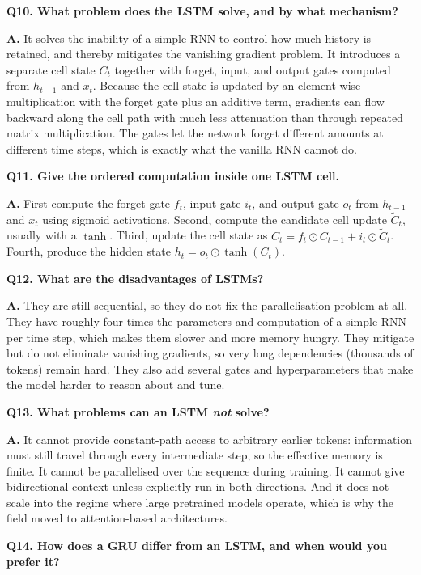 \documentclass[11pt]{article}
\begin{document}
\noindent\textbf{Q10. What problem does the LSTM solve, and by what mechanism?}

\noindent\textbf{A.} It solves the inability of a simple RNN to control how much history is retained, and thereby mitigates the vanishing gradient problem. It introduces a separate cell state $C_t$ together with forget, input, and output gates computed from $h_{t-1}$ and $x_t$. Because the cell state is updated by an element-wise multiplication with the forget gate plus an additive term, gradients can flow backward along the cell path with much less attenuation than through repeated matrix multiplication. The gates let the network forget different amounts at different time steps, which is exactly what the vanilla RNN cannot do.

\medskip
\noindent\textbf{Q11. Give the ordered computation inside one LSTM cell.}

\noindent\textbf{A.} First compute the forget gate $f_t$, input gate $i_t$, and output gate $o_t$ from $h_{t-1}$ and $x_t$ using sigmoid activations. Second, compute the candidate cell update $\tilde{C}_t$, usually with a $\tanh$. Third, update the cell state as $C_t = f_t \odot C_{t-1} + i_t \odot \tilde{C}_t$. Fourth, produce the hidden state $h_t = o_t \odot \tanh(C_t)$.

\medskip
\noindent\textbf{Q12. What are the disadvantages of LSTMs?}

\noindent\textbf{A.} They are still sequential, so they do not fix the parallelisation problem at all. They have roughly four times the parameters and computation of a simple RNN per time step, which makes them slower and more memory hungry. They mitigate but do not eliminate vanishing gradients, so very long dependencies (thousands of tokens) remain hard. They also add several gates and hyperparameters that make the model harder to reason about and tune.

\medskip
\noindent\textbf{Q13. What problems can an LSTM \emph{not} solve?}

\noindent\textbf{A.} It cannot provide constant-path access to arbitrary earlier tokens: information must still travel through every intermediate step, so the effective memory is finite. It cannot be parallelised over the sequence during training. It cannot give bidirectional context unless explicitly run in both directions. And it does not scale into the regime where large pretrained models operate, which is why the field moved to attention-based architectures.

\medskip
\noindent\textbf{Q14. How does a GRU differ from an LSTM, and when would you prefer it?}
\end{document}
